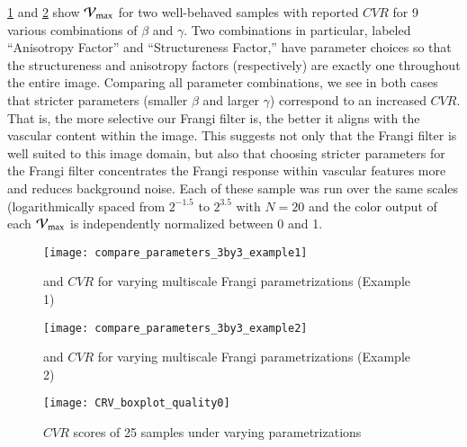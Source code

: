 \cref{fig:compare_parameters_3by3_example1} and \cref{fig:compare_parameters_3by3_example2} show $\mathcal{V}_{\max}$ for two well-behaved samples with reported $CVR$ for 9 various combinations of $\beta$ and $\gamma$. Two combinations in particular, labeled ``Anisotropy Factor'' and ``Structureness Factor,'' have parameter choices so that the structureness and anisotropy factors (respectively) are exactly one throughout the entire image. Comparing all parameter combinations, we see in both cases that stricter parameters (smaller $\beta$ and larger $\gamma$) correspond to an increased $CVR$. That is, the more selective our Frangi filter is, the better it aligns with the vascular content within the image. This suggests not only that the Frangi filter is well suited to this image domain, but also that choosing stricter parameters for the Frangi filter concentrates the Frangi response within vascular features more and reduces background noise. Each of these sample was run over the same scales (logarithmically spaced from $2^{-1.5}$ to $2^{3.5}$ with $N=20$ and the color output of each $\mathcal{V}_{\max}$ is independently normalized between 0 and 1.




\begin{figure}[p]\centering
		\texttt{[image: compare\_parameters\_3by3\_example1]}
	\caption{\Vmax  and $CVR$ for varying multiscale Frangi parametrizations (Example 1)}
	\label{fig:compare_parameters_3by3_example1}
\end{figure}

\begin{figure}[p]\centering
	\texttt{[image: compare\_parameters\_3by3\_example2]}
	\caption{\Vmax  and $CVR$ for varying multiscale Frangi parametrizations (Example 2)}
	\label{fig:compare_parameters_3by3_example2}
\end{figure}

\begin{figure}\centering
	\texttt{[image: CRV\_boxplot\_quality0]}
	\caption{$CVR$ scores of 25 samples under varying parametrizations}
  \label{fig:CVR-boxplot-quality0}
\end{figure}

